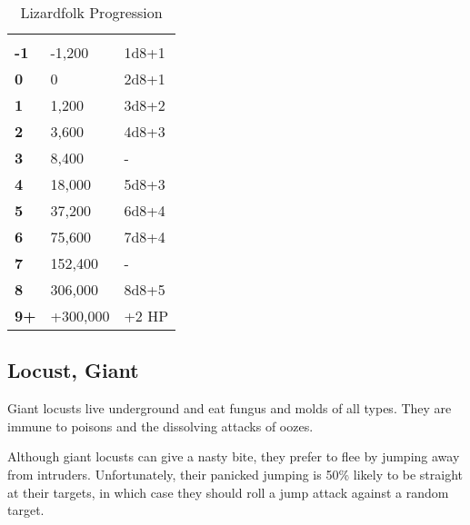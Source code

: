 \begin{multicols*}{2}
\begin {table}[H]
  \caption{Lizardfolk Progression}
  \begin{tabularx}{\columnwidth}{>{\bfseries}YYY}
   &  & \\
	-1 & -1,200 & 1d8+1\\
	0 & 0 & 2d8+1\\
	1 & 1,200 & 3d8+2\\
	2 & 3,600 & 4d8+3\\
	3 & 8,400 & -\\
	4 & 18,000 & 5d8+3\\
	5 & 37,200 & 6d8+4\\
	6 & 75,600 & 7d8+4\\
	7 & 152,400 & -\\
	8 & 306,000 & 8d8+5\\
	9+ & +300,000 & +2 HP
  \end {tabularx}
\end {table}

\subsection{Locust, Giant}

Giant locusts live underground and eat fungus and molds of all types. They are immune to poisons and the dissolving attacks of oozes.

Although giant locusts can give a nasty bite, they prefer to flee by jumping away from intruders. Unfortunately, their panicked jumping is 50\% likely to be straight at their targets, in which case they should roll a jump attack against a random target.


\end{multicols*}
